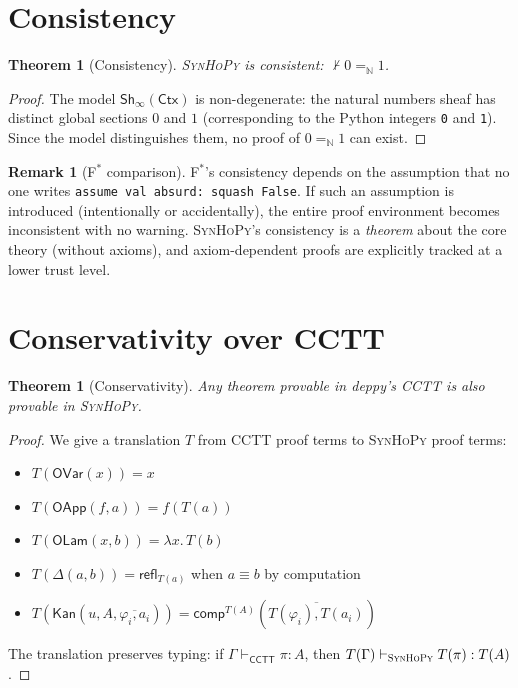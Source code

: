 \documentclass[11pt,a4paper]{report}
\theoremstyle{definition}
\newtheorem{remark}[definition]{Remark}
\theoremstyle{plain}
\newtheorem{theorem}[definition]{Theorem}
\newcommand{\Nat}{\mathbb{N}}
\newcommand{\comp}{\mathsf{comp}}
\newcommand{\Refl}{\mathsf{refl}}
\newcommand{\Ctx}{\mathsf{Ctx}}
\newcommand{\fstar}{F$^{*}$}
\newcommand{\synhopy}{\textsc{SynHoPy}}
\newcommand{\Sh}{\mathsf{Sh}}
\begin{document}
\section{Consistency}

\begin{theorem}[Consistency]
\label{thm:consistency}
\synhopy{} is consistent: $\nvdash 0 =_\Nat 1$.
\end{theorem}
\begin{proof}
The model $\Sh_\infty(\Ctx)$ is non-degenerate: the natural numbers sheaf has
distinct global sections $0$ and $1$ (corresponding to the Python integers
\lstinline[style=python]{0} and \lstinline[style=python]{1}). Since the model
distinguishes them, no proof of $0 =_\Nat 1$ can exist.
\end{proof}

\begin{remark}[\fstar{} comparison]
\fstar{}'s consistency depends on the assumption that no one writes
\lstinline[style=fstar]{assume val absurd: squash False}. If such an assumption
is introduced (intentionally or accidentally), the entire proof environment
becomes inconsistent with no warning. \synhopy{}'s consistency is a
\emph{theorem} about the core theory (without axioms), and axiom-dependent
proofs are explicitly tracked at a lower trust level.
\end{remark}

\section{Conservativity over CCTT}

\begin{theorem}[Conservativity]
\label{thm:conservativity}
Any theorem provable in deppy's CCTT is also provable in \synhopy{}.
\end{theorem}
\begin{proof}
We give a translation $T$ from CCTT proof terms to \synhopy{} proof terms:
\begin{itemize}
  \item $T(\mathsf{OVar}(x)) = x$
  \item $T(\mathsf{OApp}(f, a)) = f(T(a))$
  \item $T(\mathsf{OLam}(x, b)) = \lambda x.\, T(b)$
  \item $T(\Delta(a, b)) = \Refl_{T(a)}$ when $a \equiv b$ by computation
  \item $T(\mathsf{Kan}(u, A, \overline{\varphi_i, a_i})) = \comp^{T(A)}(\overline{T(\varphi_i), T(a_i)})$
\end{itemize}
The translation preserves typing: if $\Gamma \vdash_{\mathsf{CCTT}} \pi : A$,
then $T(\Gamma) \vdash_{\synhopy} T(\pi) : T(A)$.
\end{proof}
\end{document}
